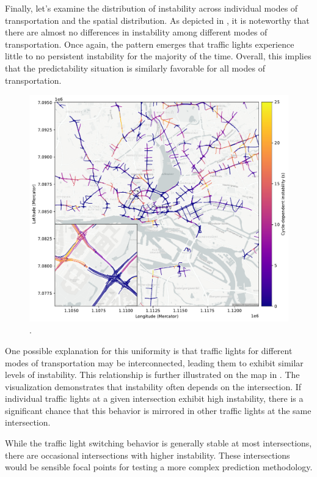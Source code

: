 Finally, let's examine the distribution of instability across individual modes of transportation and the spatial distribution. As depicted in , it is noteworthy that there are almost no differences in instability among different modes of transportation. Once again, the pattern emerges that traffic lights experience little to no persistent instability for the majority of the time. Overall, this implies that the predictability situation is similarly favorable for all modes of transportation.

\begin{figure}[ht]
    \centering
    \includegraphics[width=\linewidth]{images/predictability-map.pdf}
    \caption{.}\label{fig:predictability-map}
\end{figure}

One possible explanation for this uniformity is that traffic lights for different modes of transportation may be interconnected, leading them to exhibit similar levels of instability. This relationship is further illustrated on the map in . The visualization demonstrates that instability often depends on the intersection. If individual traffic lights at a given intersection exhibit high instability, there is a significant chance that this behavior is mirrored in other traffic lights at the same intersection.

While the traffic light switching behavior is generally stable at most intersections, there are occasional intersections with higher instability. These intersections would be sensible focal points for testing a more complex prediction methodology.

